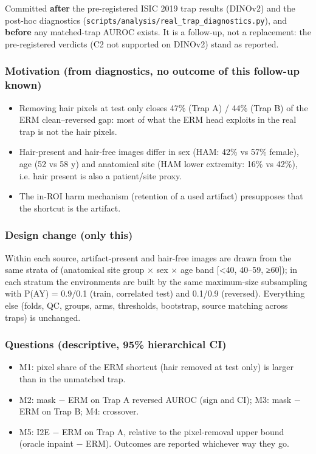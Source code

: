 {\small
Committed \textbf{after} the pre-registered ISIC 2019 trap results (DINOv2) and the post-hoc diagnostics
(\texttt{scripts/analysis/real\_trap\_diagnostics.py}), and \textbf{before} any matched-trap AUROC exists. It is a
follow-up, not a replacement: the pre-registered verdicts (C2 not supported on DINOv2) stand as reported.

\subsubsection{Motivation (from diagnostics, no outcome of this follow-up known)}\label{motivation-from-diagnostics-no-outcome-of-this-follow-up-known}

\begin{itemize}

\item
  Removing hair pixels at test only closes 47\% (Trap A) / 44\% (Trap B) of the ERM clean--reversed gap: most of
  what the ERM head exploits in the real trap is not the hair pixels.
\item
  Hair-present and hair-free images differ in sex (HAM: 42\% vs 57\% female), age (52 vs 58 y) and
  anatomical site (HAM lower extremity: 16\% vs 42\%), i.e. \textquotesingle hair present\textquotesingle{} is also a patient/site proxy.
\item
  The in-ROI harm mechanism (retention of a used artifact) presupposes that the shortcut is the artifact.
\end{itemize}

\subsubsection{Design change (only this)}\label{design-change-only-this}

Within each source, artifact-present and hair-free images are drawn from the same strata of
(anatomical site group × sex × age band {[}\textless40, 40--59, ≥60{]}); in each stratum the environments are built by
the same maximum-size subsampling with P(A\textbar Y) = 0.9/0.1 (train, correlated test) and 0.1/0.9 (reversed).
Everything else (folds, QC, groups, arms, thresholds, bootstrap, source matching across traps) is unchanged.

\subsubsection{Questions (descriptive, 95\% hierarchical CI)}\label{questions-descriptive-95-hierarchical-ci}

\begin{itemize}

\item
  M1: pixel share of the ERM shortcut (hair removed at test only) is larger than in the unmatched trap.
\item
  M2: mask − ERM on Trap A reversed AUROC (sign and CI); M3: mask − ERM on Trap B; M4: crossover.
\item
  M5: I2E − ERM on Trap A, relative to the pixel-removal upper bound (oracle inpaint − ERM).
  Outcomes are reported whichever way they go.
\end{itemize}

}

